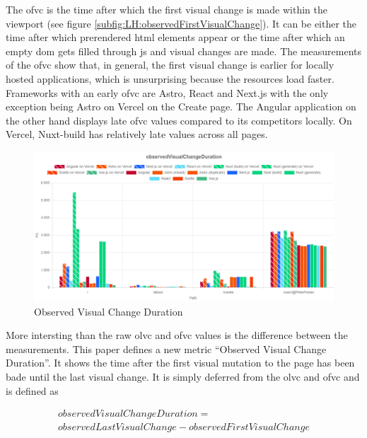 \documentclass[a4paper, 10pt]{article}
\begin{document}
The \acrshort{ofvc} is the time after which the first visual change is made within the viewport (see figure \ref{subfig:LH:observedFirstVisualChange}).
It can be either the time after which prerendered \acrshort{html} elements appear or the time after which an empty \acrshort{dom} gets filled through \acrshort{js} and visual changes are made.
The measurements of the \acrshort{ofvc} show that, in general, the first visual change is earlier for locally hosted applications, which is unsurprising because the resources load faster.
Frameworks with an early \acrshort{ofvc} are Astro, React and Next.js with the only exception being Astro on Vercel on the Create page.
The Angular application on the other hand displays late \acrshort{ofvc} values compared to its competitors locally.
On Vercel, Nuxt-build has relatively late values across all pages.


\begin{figure}[ht!]
  \centering
  \includegraphics[width=\linewidth, keepaspectratio]{img/lighthouse-results/olvc-ofvc.png}
  \caption{Observed Visual Change Duration}
  \label{fig:LH:OVCD}
\end{figure}

More intersting than the raw \acrshort{olvc} and \acrshort{ofvc} values is the difference between the measurements.
This paper defines a new metric \enquote{Observed Visual Change Duration}.
It shows the time after the first visual mutation to the page has been bade until the last visual change.
It is simply deferred from the \acrshort{olvc} and \acrshort{ofvc} and is defined as

\begin{multline}
  \mathit{observedVisualChangeDuration} =\\ \mathit{observedLastVisualChange} - \mathit{observedFirstVisualChange}
\end{multline}
\end{document}
